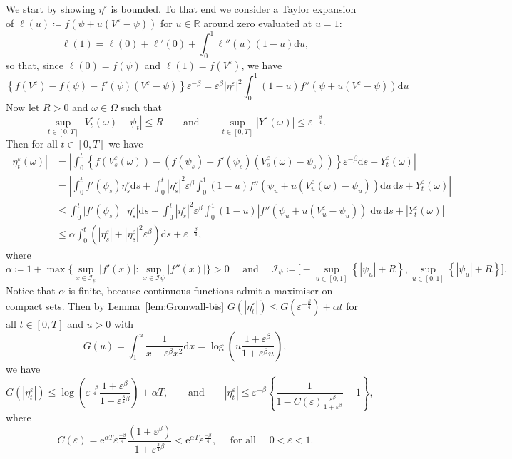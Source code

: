 \documentclass{amsart}[11pt]
\numberwithin{equation}{section}
\numberwithin{theorem}{subsection}
\numberwithin{proposition}{subsection}
\numberwithin{definition}{subsection}
\numberwithin{lemma}{subsection}
\numberwithin{assumption}{subsection}
\newcommand{\RR}{\mathbb{R}}
\newcommand{\R}{\RR}
\newcommand{\D}{\mathrm{d}}
\newcommand{\E}{\mathrm{e}}
\newcommand{\eps}{\varepsilon}
\begin{document}
We start by showing $\eta^\eps$ is bounded. To that end we consider a Taylor expansion of $\ell(u) \coloneqq f(\psi+u(V^\eps - \psi))$ for $u\in\R$ around zero evaluated at $u=1$:
\[
\ell(1)=\ell(0)+\ell'(0) + \int_0^1 \ell''(u)(1-u)\D u,
\]
so that, since $\ell(0)=f(\psi)$ and $\ell(1)=f(V^\eps)$, we have 
\[
\left\{f(V^\eps) - f(\psi) - f'(\psi)(V^\eps -\psi)\right\}\eps^{-\beta} = \eps^\beta |\eta^\eps|^2 \int_0^1 (1-u)f''(\psi + u (V^\eps - \psi))\D u
\]
Now let $R>0$ and $\omega \in \Omega$ such that 
\[
\sup_{t \in [0,T]}|V_t^\eps(\omega) - \psi_t|\leq R
\qquad\text{and}\qquad 
\sup_{t \in [0,T]}|Y^\eps(\omega)| \leq \eps^{-\frac{\beta}{4}}.
\]
Then for all $t\in[0,T]$ we have
\begin{align*}
\left|\eta_{t}^\eps(\omega)\right| &= \left\lvert \int_0^t\left\{f(V^\eps_s(\omega)) - \left(f(\psi_s) - f'(\psi_s)(V_s^\eps(\omega) -\psi_s)\right)\right\}\eps^{-\beta}\D s + Y^{\eps}_t(\omega)\right\rvert \\
&= \left\lvert\int_0^t f'(\psi_s)\eta_{s}^\eps\D s + \int_0^t|\eta_{s}^\eps|^2\eps^{\beta} \int_0^1(1-u)f''(\psi_u + u(V^\eps_u(\omega) - \psi_u))\D u\,\D s + Y_t^\eps(\omega)\right\rvert \\
&\leq \int_0^t\big|f'(\psi_s)\big| |\eta_{s}^\eps|\D s + \int_0^t|\eta_{s}^\eps|^2\eps^{\beta} \int_0^1(1-u)\left|f''\left(\psi_u + u(V^\eps_u - \psi_u)\right)\right|\D u\,\D s + \left|Y_t^\eps(\omega)\right|\\
&\leq \alpha \int_0^t\left(|\eta_{s}^\eps| + |\eta_{s}^\eps|^2\eps^{\beta}\right) \D s + \eps^{-\frac{\beta}{4}},
\end{align*}
where 
\[
\alpha \coloneqq 1+\max\Big\{\sup_{x \in \mathcal{I}_\psi}\big|f'(x)\big| : \sup_{x\in \mathcal{I}\psi}\big|f''(x)\big| \Big\}>0 \quad \text{ and } \quad \mathcal{I}_\psi \coloneqq  \Big[-\sup_{u \in [0,1]}\left\{|\psi_u|+ R\right\},\sup_{u \in [0,1]}\left\{|\psi_u| + R\right\}\Big].
\]
Notice that $\alpha$ is finite, because continuous functions admit a maximiser on compact sets. Then by Lemma~\ref{lem:Gronwall-bis} $G(|\eta_{t}^\eps|) \leq G(\eps^{-\frac{\beta}{4}}) + \alpha t$ for all $t \in [0,T]$ and $u>0$ with 
$$
G(u) = \int_1^u\frac{1}{x + \eps^\beta x^2}\D x = \log\left(u\frac{1+\eps^\beta}{1 + \eps^\beta u}\right),
$$
we have
$$
G(|\eta_{t}^\eps|) 
\leq \log\left(\eps^{\frac{-\beta}{4}}\frac{1+\eps^\beta}{1 + \eps^{\frac{3}{4}\beta}}\right) + \alpha T,
\qquad\text{and}\qquad
|\eta_{t}^\eps| \leq \eps^{-\beta}\left\{\frac{1}{1 - C(\eps)\frac{\eps^\beta}{1 + \eps^\beta}} - 1 \right\},
$$
where 
$$
C(\eps) = \E^{\alpha T}\eps^{\frac{-\beta}{4}}\frac{(1+\eps^\beta)}{1 + \eps^{\frac{3}{4}\beta}}
 <\E^{\alpha T}\eps^{\frac{-\beta}{4}}, 
\quad \text{ for all } \quad 0<\eps<1.
$$
\end{document}
